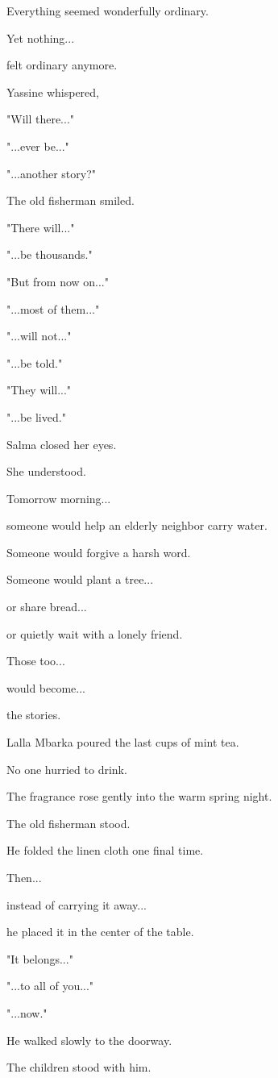 \documentclass[12pt,openany]{book}
\begin{document}
Everything seemed wonderfully ordinary.

Yet nothing...

felt ordinary anymore.

Yassine whispered,

"Will there..."

"...ever be..."

"...another story?"

The old fisherman smiled.

"There will..."

"...be thousands."

"But from now on..."

"...most of them..."

"...will not..."

"...be told."

"They will..."

"...be lived."

Salma closed her eyes.

She understood.

Tomorrow morning...

someone would help an elderly neighbor carry water.

Someone would forgive a harsh word.

Someone would plant a tree...

or share bread...

or quietly wait with a lonely friend.

Those too...

would become...

the stories.

Lalla Mbarka poured the last cups of mint tea.

No one hurried to drink.

The fragrance rose gently into the warm spring night.

The old fisherman stood.

He folded the linen cloth one final time.

Then...

instead of carrying it away...

he placed it in the center of the table.

"It belongs..."

"...to all of you..."

"...now."

He walked slowly to the doorway.

The children stood with him.
\end{document}
